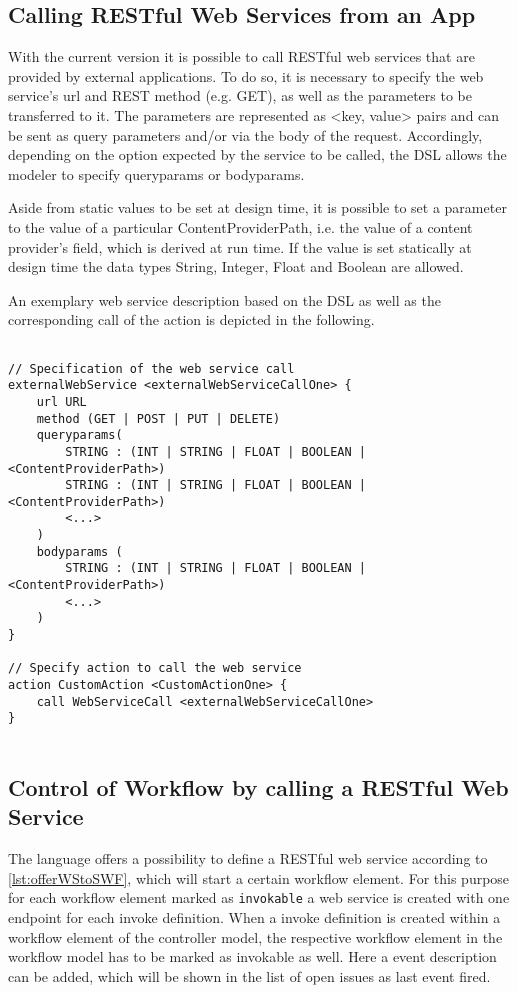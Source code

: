 
\subsection{Calling RESTful Web Services from an App}
\label{subsec: CallingWebServices}
With the current \MD version it is possible to call RESTful web services that are provided by external applications. To do so, it is necessary to specify the web service's url and REST method (e.g. GET), as well as the parameters to be transferred to it. The parameters are represented as <key, value> pairs and can be sent as query parameters and/or via the body of the request. Accordingly, depending on the option expected by the service to be called, the DSL allows the modeler to specify queryparams or bodyparams. 

Aside from static values to be set at design time, it is possible to set a parameter to the value of a particular ContentProviderPath, i.e. the value of a content provider's field, which is derived at run time. If the value is set statically at design time the data types String, Integer, Float and Boolean are allowed. 

An exemplary web service description based on the DSL as well as the corresponding call of the action is depicted in the following.

\begin{lstlisting}[language=MD2, label=lst:callWSfromWF, caption=Calling a Web Service From Within a Workflow]

// Specification of the web service call
externalWebService <externalWebServiceCallOne> {
	url URL
	method (GET | POST | PUT | DELETE)
	queryparams(
		STRING : (INT | STRING | FLOAT | BOOLEAN | <ContentProviderPath>)	
		STRING : (INT | STRING | FLOAT | BOOLEAN | <ContentProviderPath>)
		<...>	
	)
	bodyparams (
		STRING : (INT | STRING | FLOAT | BOOLEAN | <ContentProviderPath>)
		<...>
	)
}

// Specify action to call the web service
action CustomAction <CustomActionOne> {
	call WebServiceCall <externalWebServiceCallOne>
}
	
\end{lstlisting}





\subsection{Control of Workflow by calling a RESTful Web Service}
\label{subsec: WorkflowControlThroughWS}
The \MD language offers a possibility to define a RESTful web service according to \cref{lst:offerWStoSWF}, which will start a certain workflow element. For this purpose for each workflow element marked as \lstinline|invokable| a web service is created with one endpoint for each invoke definition. 
When a invoke definition is created within a workflow element of the controller model, the respective workflow element in the workflow model has to be marked as invokable as well. Here a event description can be added, which will be shown in the list of open issues as last event fired.


